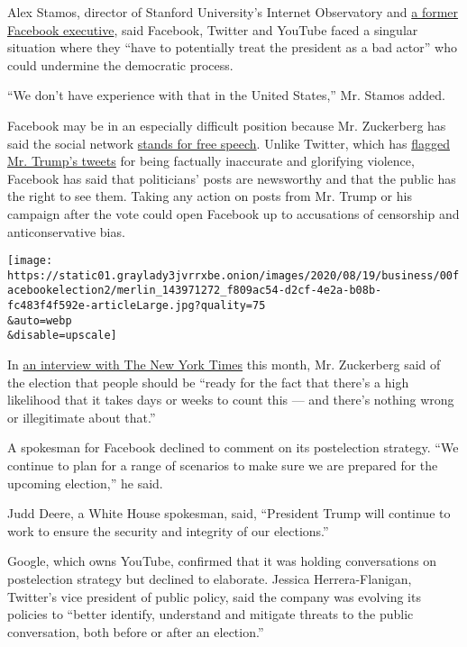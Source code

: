 Alex Stamos, director of Stanford University's Internet Observatory and
\href{https://www.nytimes3xbfgragh.onion/2018/03/19/technology/facebook-alex-stamos.html}{a
former Facebook executive}, said Facebook, Twitter and YouTube faced a
singular situation where they ``have to potentially treat the president
as a bad actor'' who could undermine the democratic process.

``We don't have experience with that in the United States,'' Mr. Stamos
added.

Facebook may be in an especially difficult position because Mr.
Zuckerberg has said the social network
\href{https://www.nytimes3xbfgragh.onion/2020/06/02/technology/zuckerberg-defends-facebook-trump-posts.html}{stands
for free speech}. Unlike Twitter, which has
\href{https://www.nytimes3xbfgragh.onion/2020/05/30/technology/twitter-trump-dorsey.html}{flagged
Mr. Trump's tweets} for being factually inaccurate and glorifying
violence, Facebook has said that politicians' posts are newsworthy and
that the public has the right to see them. Taking any action on posts
from Mr. Trump or his campaign after the vote could open Facebook up to
accusations of censorship and anticonservative bias.

\texttt{[image: https://static01.graylady3jvrrxbe.onion/images/2020/08/19/business/00facebookelection2/merlin\_143971272\_f809ac54-d2cf-4e2a-b08b-fc483f4f592e-articleLarge.jpg?quality=75\\\&auto=webp\\\&disable=upscale]}

In
\href{https://www.nytimes3xbfgragh.onion/2020/08/02/business/media/election-coverage.html}{an
interview with The New York Times} this month, Mr. Zuckerberg said of
the election that people should be ``ready for the fact that there's a
high likelihood that it takes days or weeks to count this --- and
there's nothing wrong or illegitimate about that.''

A spokesman for Facebook declined to comment on its postelection
strategy. ``We continue to plan for a range of scenarios to make sure we
are prepared for the upcoming election,'' he said.

Judd Deere, a White House spokesman, said, ``President Trump will
continue to work to ensure the security and integrity of our
elections.''

Google, which owns YouTube, confirmed that it was holding conversations
on postelection strategy but declined to elaborate. Jessica
Herrera-Flanigan, Twitter's vice president of public policy, said the
company was evolving its policies to ``better identify, understand and
mitigate threats to the public conversation, both before or after an
election.''

